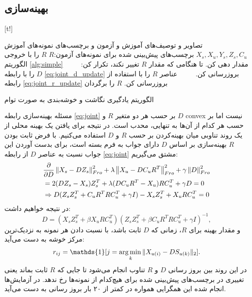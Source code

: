 \subsection{بهینه‌سازی}

[t!]
	\begin{enumerate}[label={\arabic*},itemsep=.1em, parsep=.1em]
 تصاویر و توصیف‌های آموزش و آزمون و برچسب‌های نمونه‌های آموزش $X_s, X_u, Y_s, Z_s, C_u$
 برچسب‌های پیش‌بینی شده برای نمونه‌های آزمون:$R$
 $R$ را با خروجی الگوریتم \ref{alg:simple} مقدار دهی کن.
 تا هنگامی که مقدار $R$ تغییر نکند،  تکرار کن:
 $\qquad$  $D$ را با رابطه \eqref{eq:joint_d_update} بروزرسانی کن.
 $\qquad$ عناصر $R$ را با استفاده از رابطه \eqref{eq:joint_r_update} بروزرسانی کن.
 $R$ را برگردان
\end{enumerate}
\caption{الگوریتم یادگیری نگاشت و خوشه‌بندی به صورت توام}
\label{alg:jeac}

مسئله بهینه‌سازی رابطه \eqref{eq:joint} بر حسب هر دو متغیر $R$ و $D$
\gls{convex}  نیست اما بر حسب هر کدام از آن‌ها به تنهایی، محدب است. در نتیجه برای یافتن یک بهینه محلی از یک روند تناوبی میان بهینه‌کردن بر حسب $R$ و $D$ استفاده می‌کنیم.
با فرض ثابت بودن $R$ بهینه‌سازی بر اساس $D$ دارای جواب به فرم بسته است، برای بدست آوردن این جواب نسبت به عناصر $D$ از رابطه \eqref{eq:joint} مشتق می‌گیریم:
\begin{align*}
& \frac{\partial}{\partial D}\left \lVert X_s - D Z_s \right \rVert_{Fro}^2  + \lambda \left \lVert X_u - D C_u R^T  \right \rVert_{Fro}^2 + \gamma \left \lVert D \right \rVert_{Fro}^2 \\
& =2 (DZ_s - X_s)Z_s^T + \lambda (DC_uR^T - X_u) RC_u^T + \gamma D = 0 \\
& \Rightarrow D(Z_sZ_s^T + C_uR^TRC_u^T + \gamma I) - X_sZ_s^T + X_uRC_u^T  = 0
\end{align*}
در نتیجه خواهیم داشت:
\begin{equation} \label{eq:joint_d_update}
  D = (X_s Z_s^T + \beta X_u R C_u^T) (Z_s Z_s^T + \beta C_u R^T R C_u^T  + \gamma I)^{-1},
\end{equation}
و مقدار بهینه برای $R$، زمانی که $D$ ثابت باشد، با نسبت دادن هر نمونه به نزدیک‌ترین مرکز خوشه به دست می‌آید:
\begin{equation} \label{eq:joint_r_update}
  r_{ij} = \mathds{1}[j = \argmin_{k} \lVert X_{u(i)} - D S_{u(k)} \rVert_2 ].
\end{equation}
در این روند بین بروز رسانی $D$ و $R$ تناوب انجام می‌شود تا جایی که $R$ ثابت بماند یعنی تغییری در برچسب‌های پیش‌بینی شده برای هیچ‌کدام از نمونه‌ها رخ ندهد. در آزمایش‌ها انجام شده این همگرایی همواره در کمتر از ۲۰ بار بروز رسانی به دست می‌آید.

